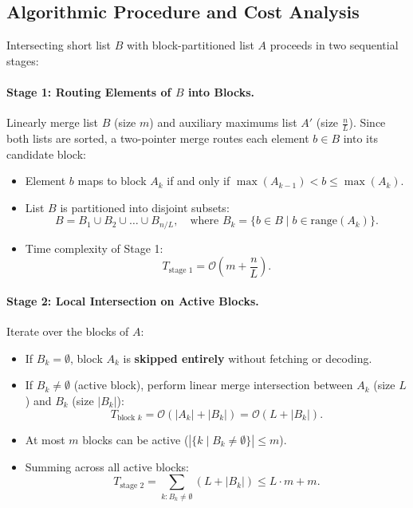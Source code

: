 \subsection{Algorithmic Procedure and Cost Analysis}
Intersecting short list $B$ with block-partitioned list $A$ proceeds in two sequential stages:

\paragraph{Stage 1: Routing Elements of $B$ into Blocks.}
Linearly merge list $B$ (size $m$) and auxiliary maximums list $A'$ (size $\frac{n}{L}$). Since both lists are sorted, a two-pointer merge routes each element $b \in B$ into its candidate block:
\begin{itemize}
  \item Element $b$ maps to block $A_k$ if and only if $\max(A_{k-1}) < b \le \max(A_k)$.
  \item List $B$ is partitioned into disjoint subsets:
  \begin{equation}
    B = B_1 \cup B_2 \cup \dots \cup B_{n/L}, \quad \text{where } B_k = \{b \in B \mid b \in \text{range}(A_k)\}.
  \end{equation}
  \item Time complexity of Stage 1:
  \begin{equation}
    T_{\text{stage 1}} = \mathcal{O}\left(m + \frac{n}{L}\right).
  \end{equation}
\end{itemize}

\paragraph{Stage 2: Local Intersection on Active Blocks.}
Iterate over the blocks of $A$:
\begin{itemize}
  \item If $B_k = \emptyset$, block $A_k$ is \textbf{skipped entirely} without fetching or decoding.
  \item If $B_k \neq \emptyset$ (active block), perform linear merge intersection between $A_k$ (size $L$) and $B_k$ (size $|B_k|$):
  \begin{equation}
    T_{\text{block } k} = \mathcal{O}(|A_k| + |B_k|) = \mathcal{O}(L + |B_k|).
  \end{equation}
  \item At most $m$ blocks can be active ($|\{k \mid B_k \neq \emptyset\}| \le m$).
  \item Summing across all active blocks:
  \begin{equation}
    T_{\text{stage 2}} = \sum_{k: B_k \neq \emptyset} (L + |B_k|) \le L \cdot m + m.
  \end{equation}
\end{itemize}

